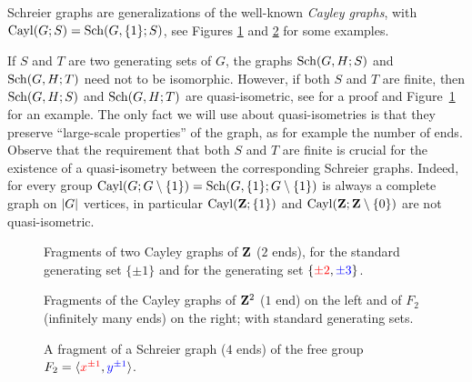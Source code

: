 Schreier graphs are generalizations of the well-known \emph{Cayley graphs}, with $\operatorname{Cayl}(G;S)=\operatorname{Sch}(G,\{1\};S)$, see Figures \ref{Figure:CayleyOfZ} and \ref{Figure:CayleyOfZ2} for some examples.

If $S$ and $T$ are two generating sets of $G$, the graphs $\operatorname{Sch}(G,H;S)$ and $\operatorname{Sch}(G,H;T)$ need not to be isomorphic. However, if both $S$ and $T$ are finite, then $\operatorname{Sch}(G,H;S)$ and $\operatorname{Sch}(G,H;T)$ are quasi-isometric, see \cite[IV.B.21.iii]{DelaHarpe2000} for a proof and Figure~\ref{Figure:CayleyOfZ} for an example. The only fact we will use about quasi-isometries is that they preserve ``large-scale properties'' of the graph, as for example the number of ends.
Observe that the requirement that both $S$ and $T$ are finite is crucial for the existence of a quasi-isometry between the corresponding Schreier graphs. Indeed, for every group  $\operatorname{Cayl}(G;G\setminus\{1\})=\operatorname{Sch}(G,\{1\};G\setminus\{1\})$ is always a complete graph on $\lvert G\rvert$ vertices, in particular  $\operatorname{Cayl}(\mathbf{Z};\{1\})$ and $\operatorname{Cayl}(\mathbf{Z};\mathbf{Z}\setminus\{0\})$ are not quasi-isometric.

%
%
\begin{figure}[htbp]\centering

\caption{Fragments of two Cayley graphs of $\mathbf{Z}$ ($2$ ends), for the standard generating set $\{\pm1\}$ and for the generating set $\{\textcolor{red}{\pm2},\textcolor{blue}{\pm3}\}$.}
\label{Figure:CayleyOfZ}
\end{figure}
\begin{figure}[htbp]\centering
\begin{subfigure}{0.5\textwidth}
\centering

\end{subfigure}%
\begin{subfigure}{0.5\textwidth}
\centering
\scalebox{0.8}{}
\end{subfigure}
\caption{Fragments of the Cayley graphs of $\mathbf{Z}^2$ ($1$ end) on the left and of $F_2$ (infinitely many ends) on the right; with standard generating sets.}
\label{Figure:CayleyOfZ2}
\end{figure}
\begin{figure}[htbp]\centering

\caption{A fragment of a Schreier graph ($4$ ends) of the free group $F_2=\langle \textcolor{red}{x^{\pm1}},\textcolor{blue}{y^{\pm1}}\rangle$.}
\label{Figure:SchreierOfF2}
\end{figure}
%
%

